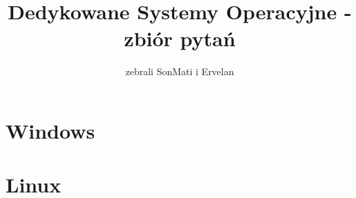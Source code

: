 \documentclass[a4paper,twoside]{article}
\newcommand{\Tak}[1] {
	\color{Gurin}{#1}
}
\newcommand{\Nie}[1] {
	\color{Red}{#1}
}
\newcommand{\question}[9] {
	\textbf{#1}
	\begin{enumerate}[a.]
		\ifnum\pdfstrcmp{#2}{Tak}=0
			\Tak{\item #3}
		\else
			\Nie{\item #3}
		\fi
		\color{black}
		\ifnum\pdfstrcmp{#4}{Tak}=0
			\Tak{\item #5}
		\else
			\Nie{\item #5}
		\fi
		\color{black}
		\ifnum\pdfstrcmp{#6}{Tak}=0
			\Tak{\item #7}
		\else
			\Nie{\item #7}
		\fi
		\color{black}
		\ifnum\pdfstrcmp{#8}{Tak}=0
			\Tak{\item #9}
		\else
			\Nie{\item #9}
		\fi
	\end{enumerate}
}
\begin{document}





\begin{titlepage}
\title{\huge Dedykowane Systemy Operacyjne - zbiór pytań}
\author{\large zebrali SonMati i Ervelan}
\maketitle
\end{titlepage}

\part{Windows}
	
	
	
	
		
	
	
	
	
	
	
	
	
	\newpage
\part{Linux}
	
	
	
	
	
	
	
	
	
	
	
	
\end{document}
